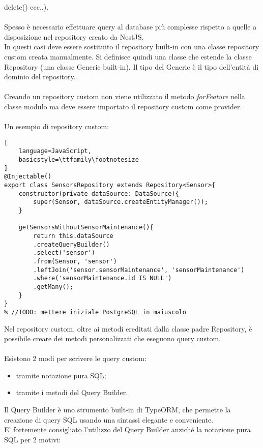 delete() ecc..).
\\\\
Spesso è necessario effettuare query al database più complesse rispetto a quelle a disposizione nel repository
creato da NestJS. 
\\
In questi casi deve essere sostituito il repository built-in con una classe repository custom creata manualmente. 
Si definisce quindi una classe che
estende la classe Repository (una
classe Generic built-in). Il tipo del Generic è il tipo dell'entità di dominio 
del repository.
\\\\
Creando un repository custom non viene utilizzato il metodo \textit{forFeature} nella classe modulo ma deve essere importato il repository custom
come provider.
\\\\ 
Un esempio di repository custom:
\begin{lstlisting}[
    language=JavaScript,
    basicstyle=\ttfamily\footnotesize
]
@Injectable()
export class SensorsRepository extends Repository<Sensor>{
    constructor(private dataSource: DataSource){
        super(Sensor, dataSource.createEntityManager());
    }

    getSensorsWithoutSensorMaintenance(){
        return this.dataSource
        .createQueryBuilder()
        .select('sensor')
        .from(Sensor, 'sensor')
        .leftJoin('sensor.sensorMaintenance', 'sensorMaintenance')
        .where('sensorMaintenance.id IS NULL')
        .getMany();
    }
}
% //TODO: mettere iniziale PostgreSQL in maiuscolo
\end{lstlisting}
\leavevmode\newline
Nel repository custom, oltre ai metodi ereditati dalla classe padre Repository, è possibile creare dei metodi personalizzati
che eseguono query custom. 
\\\\
Esistono 2 modi per scrivere le query custom:
\begin{itemize}
    \item tramite notazione pura SQL;
    \item tramite i metodi del Query Builder.
\end{itemize}
\leavevmode\newline
Il Query Builder è uno strumento built-in di TypeORM, che permette la creazione di query SQL usando una sintassi elegante e conveniente.
\\
E' fortemente consigliato l'utilizzo del Query Builder anziché la notazione pura SQL per 2 motivi:

